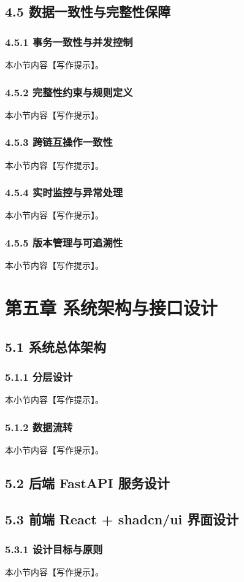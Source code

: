 \section{4.5 数据一致性与完整性保障}
\subsection{4.5.1 事务一致性与并发控制}
本小节内容【写作提示】。
\subsection{4.5.2 完整性约束与规则定义}
本小节内容【写作提示】。
\subsection{4.5.3 跨链互操作一致性}
本小节内容【写作提示】。
\subsection{4.5.4 实时监控与异常处理}
本小节内容【写作提示】。
\subsection{4.5.5 版本管理与可追溯性}
本小节内容【写作提示】。

\chapter{第五章 系统架构与接口设计}
\section{5.1 系统总体架构}
\subsection{5.1.1 分层设计}
本小节内容【写作提示】。
\subsection{5.1.2 数据流转}
本小节内容【写作提示】。
\section{5.2 后端 FastAPI 服务设计}
\section{5.3 前端 React + shadcn/ui 界面设计}
\subsection{5.3.1 设计目标与原则}
本小节内容【写作提示】。
